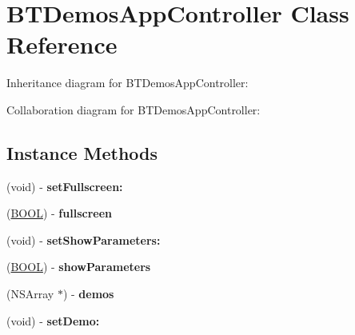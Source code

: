 \hypertarget{interface_b_t_demos_app_controller}{\section{B\+T\+Demos\+App\+Controller Class Reference}
\label{interface_b_t_demos_app_controller}
}


Inheritance diagram for B\+T\+Demos\+App\+Controller\+:


Collaboration diagram for B\+T\+Demos\+App\+Controller\+:
\subsection*{Instance Methods}
\begin{DoxyCompactItemize}
\item 
\hypertarget{interface_b_t_demos_app_controller_ae18580ce5851f5f227796188c6b6f11d}{(void) -\/ {\bfseries set\+Fullscreen\+:}}\label{interface_b_t_demos_app_controller_ae18580ce5851f5f227796188c6b6f11d}

\item 
\hypertarget{interface_b_t_demos_app_controller_ad901b6631b2a331534878d108fd42ddb}{(\hyperlink{_ice_types_8h_a050c65e107f0c828f856a231f4b4e788}{B\+O\+O\+L}) -\/ {\bfseries fullscreen}}\label{interface_b_t_demos_app_controller_ad901b6631b2a331534878d108fd42ddb}

\item 
\hypertarget{interface_b_t_demos_app_controller_adbfccf48901a9f062f69b9eaf4c002b5}{(void) -\/ {\bfseries set\+Show\+Parameters\+:}}\label{interface_b_t_demos_app_controller_adbfccf48901a9f062f69b9eaf4c002b5}

\item 
\hypertarget{interface_b_t_demos_app_controller_a50d4884b07ed01862c8fb198e5393d21}{(\hyperlink{_ice_types_8h_a050c65e107f0c828f856a231f4b4e788}{B\+O\+O\+L}) -\/ {\bfseries show\+Parameters}}\label{interface_b_t_demos_app_controller_a50d4884b07ed01862c8fb198e5393d21}

\item 
\hypertarget{interface_b_t_demos_app_controller_aefdc2263729eaec0fc6762850a2f7b82}{(N\+S\+Array $\ast$) -\/ {\bfseries demos}}\label{interface_b_t_demos_app_controller_aefdc2263729eaec0fc6762850a2f7b82}

\item 
\hypertarget{interface_b_t_demos_app_controller_a02c2ef7031db29b91603ebb3dd7f024c}{(void) -\/ {\bfseries set\+Demo\+:}}\label{interface_b_t_demos_app_controller_a02c2ef7031db29b91603ebb3dd7f024c}


\end{DoxyCompactItemize}
